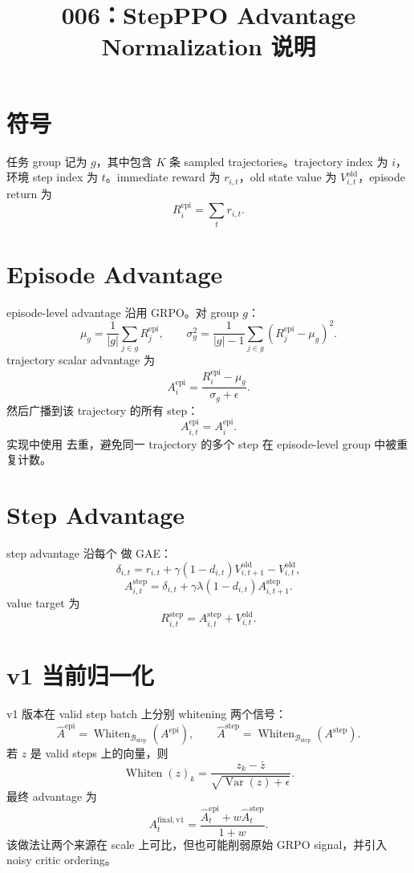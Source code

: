 \documentclass[10pt]{ctexart}
\title{006：StepPPO Advantage Normalization 说明}
\author{}
\date{}
\newcommand{\Whiten}{\operatorname{Whiten}}
\begin{document}
\maketitle
\vspace{-1.2em}

\section*{符号}
任务 group 记为 $g$，其中包含 $K$ 条 sampled trajectories。trajectory index 为 $i$，环境 step index 为 $t$。immediate reward 为 $r_{i,t}$，old state value 为 $V^{\mathrm{old}}_{i,t}$，episode return 为
\[
R_i^{\mathrm{epi}}=\sum_t r_{i,t}.
\]

\section*{Episode Advantage}
episode-level advantage 沿用 GRPO。对 group $g$：
\[
\mu_g=\frac1{|g|}\sum_{j\in g} R_j^{\mathrm{epi}},
\qquad
\sigma_g^2=\frac1{|g|-1}\sum_{j\in g}(R_j^{\mathrm{epi}}-\mu_g)^2.
\]
trajectory scalar advantage 为
\[
A_i^{\mathrm{epi}}=\frac{R_i^{\mathrm{epi}}-\mu_g}{\sigma_g+\epsilon}.
\]
然后广播到该 trajectory 的所有 step：
\[
A_{i,t}^{\mathrm{epi}}=A_i^{\mathrm{epi}}.
\]
实现中使用  去重，避免同一 trajectory 的多个 step 在 episode-level group 中被重复计数。

\section*{Step Advantage}
step advantage 沿每个  做 GAE：
\[
\delta_{i,t}=r_{i,t}+\gamma(1-d_{i,t})V^{\mathrm{old}}_{i,t+1}-V^{\mathrm{old}}_{i,t},
\]
\[
A_{i,t}^{\mathrm{step}}=\delta_{i,t}+\gamma\lambda(1-d_{i,t})A_{i,t+1}^{\mathrm{step}}.
\]
value target 为
\[
R_{i,t}^{\mathrm{step}}=A_{i,t}^{\mathrm{step}}+V^{\mathrm{old}}_{i,t}.
\]

\section*{v1 当前归一化}
v1 版本在 valid step batch 上分别 whitening 两个信号：
\[
\widehat A^{\mathrm{epi}} = \Whiten_{\mathcal{B}_{\mathrm{step}}}(A^{\mathrm{epi}}),
\qquad
\widehat A^{\mathrm{step}} = \Whiten_{\mathcal{B}_{\mathrm{step}}}(A^{\mathrm{step}}).
\]
若 $z$ 是 valid steps 上的向量，则
\[
\Whiten(z)_k=\frac{z_k-\bar z}{\sqrt{\operatorname{Var}(z)+\epsilon}}.
\]
最终 advantage 为
\[
A_t^{\mathrm{final,v1}}=\frac{\widehat A_t^{\mathrm{epi}}+w\widehat A_t^{\mathrm{step}}}{1+w}.
\]
该做法让两个来源在 scale 上可比，但也可能削弱原始 GRPO signal，并引入 noisy critic ordering。
\end{document}
